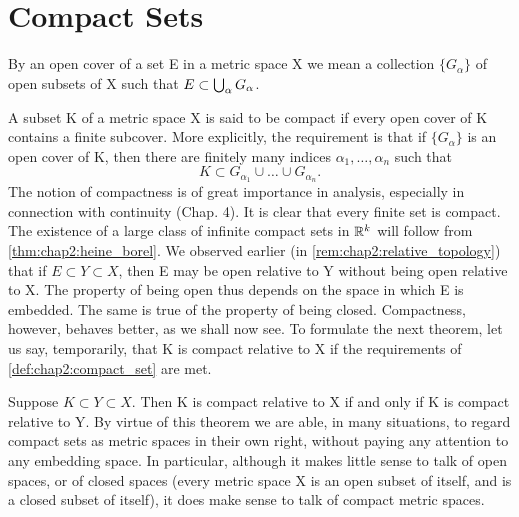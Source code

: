 

\section{Compact Sets}
\label{sec:chap2:compact_sets}

\begin{definition} %
  \label{def:chap2:open_cover}
  By an open cover of a set E in a metric space X we mean a
  collection $\{G_\alpha\}$ of open subsets of X such that $E \subset
  \bigcup_{\alpha} G_\alpha$.
\end{definition}

\begin{definition} %
  \label{def:chap2:compact_set}
  A subset K of a metric space X is said to be compact if every open
  cover of K contains a finite subcover.
  More explicitly, the requirement is that if $\{G_\alpha\}$ is an
  open cover of K, then there are finitely many indices $\alpha_1,
  \dots, \alpha_n$ such that
  \[ K \subset G_{\alpha_1} \cup \dots \cup G_{\alpha_n}. \]
  The notion of compactness is of great importance in analysis,
  especially in connection with continuity (Chap. 4).
  It is clear that every finite set is compact. The existence of a
  large class of infinite compact sets in $\mathbb{R}^k$ will follow from
  \autoref{thm:chap2:heine_borel}. %
  We observed earlier (in \autoref{rem:chap2:relative_topology}) that
  if $E \subset Y \subset X$, then E may be open relative to Y
  without being open relative to X. The property of being open thus
  depends on the space in which E is embedded. The same is true of
  the property of being closed.
  Compactness, however, behaves better, as we shall now see. To
  formulate the next theorem, let us say, temporarily, that K is
  compact relative to X if the requirements of
  \autoref{def:chap2:compact_set} are met.
\end{definition}

\begin{theorem} %
  \label{thm:chap2:compactness_intrinsic}
  Suppose $K \subset Y \subset X$. Then K is compact relative to X if
  and only if K is compact relative to Y.
  By virtue of this theorem we are able, in many situations, to
  regard compact sets as metric spaces in their own right, without
  paying any attention to any embedding space. In particular,
  although it makes little sense to talk of open spaces, or of closed
  spaces (every metric space X is an open subset of itself, and is a
  closed subset of itself), it does make sense to talk of compact metric spaces.
\end{theorem}

